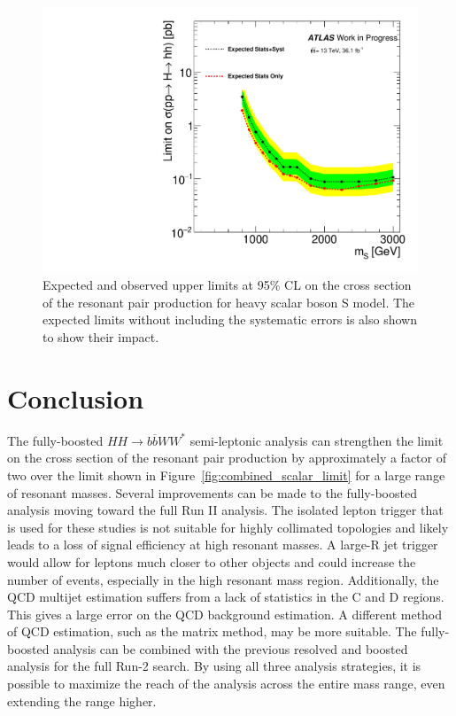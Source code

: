 \begin{figure}[h]
\begin{center}
\includegraphics[scale=0.65]{figures/Final_limits}
\caption[Expected and observed upper limits at 95\% CL on the cross section of the resonant pair production for heavy scalar boson S model]{Expected and observed upper limits at 95\% CL on the cross section of the resonant pair production for heavy scalar boson S model. The expected limits without including the systematic errors is also shown to show their impact.}
\label{fig:boosted_only_limits_new}
\end{center}
\end{figure}
\newpage

\section{Conclusion}
The fully-boosted ${HH\rightarrow b\overline{b}WW^{*}}$ semi-leptonic analysis can strengthen the limit on the cross section of the resonant pair production by approximately a factor of two over the limit shown in Figure~\ref{fig:combined_scalar_limit} for a large range of resonant masses. \newline
\indent Several improvements can be made to the fully-boosted analysis moving toward the full Run II analysis. The isolated lepton trigger that is used for these studies is not suitable for highly collimated topologies and likely leads to a loss of signal efficiency at high resonant masses. A large-R jet trigger would allow for leptons much closer to other objects and could increase the number of events, especially in the high resonant mass region. Additionally, the QCD multijet estimation suffers from a lack of statistics in the C and D regions. This gives a large error on the QCD background estimation. A different method of QCD estimation, such as the matrix method, may be more suitable.\newline
\indent The fully-boosted analysis can be combined with the previous resolved and boosted analysis for the full Run-2 search. By using all three analysis strategies, it is possible to maximize the reach of the analysis across the entire mass range, even extending the range higher. 

